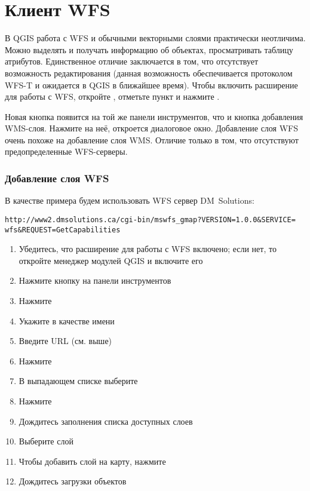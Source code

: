 %
%
\section{Клиент WFS}\label{sec:ogc-wfs}

В QGIS работа с WFS и обычными векторными слоями практически неотличима.
Можно выделять и получать информацию об объектах, просматривать таблицу
атрибутов. Единственное отличие заключается в том, что отсутствует возможность
редактирования (данная возможность обеспечивается протоколом WFS-T и ожидается
в QGIS в ближайшее время). Чтобы включить расширение для работы с WFS, откройте
 \arrow {}, отметьте пункт  и нажмите
.

Новая кнопка  появится на той
же панели инструментов, что и кнопка добавления WMS-слоя. Нажмите на неё,
откроется диалоговое окно. Добавление слоя WFS очень похоже на добавление слоя
WMS. Отличие только в том, что отсутствуют предопределенные WFS-серверы.

\subsubsection{Добавление слоя WFS}

В качестве примера будем использовать WFS сервер DM~Solutions:
\begin{verbatim}
http://www2.dmsolutions.ca/cgi-bin/mswfs_gmap?VERSION=1.0.0&SERVICE=
wfs&REQUEST=GetCapabilities
\end{verbatim}

\begin{enumerate}
  \item Убедитесь, что расширение для работы с WFS включено; если нет, то
  откройте менеджер модулей QGIS и включите его
  \item Нажмите кнопку
  на панели инструментов
  \item Нажмите 
  \item Укажите  в качестве имени
  \item Введите URL (см. выше)
  \item Нажмите 
  \item В выпадающем списке выберите 
  \item Нажмите 
  \item Дождитесь заполнения списка доступных слоев
  \item Выберите слой 
  \item Чтобы добавить слой на карту, нажмите 
  \item Дождитесь загрузки объектов
\end{enumerate}

